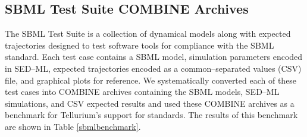 \documentclass[10pt,letterpaper]{article}
\begin{document}
\subsection*{SBML Test Suite COMBINE Archives}

The SBML Test Suite \cite{sbmltestsuite} is a collection of dynamical models along with expected trajectories designed to test software tools for compliance with the SBML standard. Each test case contains a SBML model, simulation parameters encoded in SED--ML, expected trajectories encoded as a common--separated values (CSV) file, and graphical plots for reference. We systematically converted each of these test cases into COMBINE archives containing the SBML models, SED--ML simulations, and CSV expected results and used these COMBINE archives as a benchmark for Tellurium's support for standards. The results of this benchmark are shown in Table \ref{sbmlbenchmark}.







\end{document}
